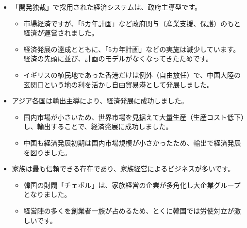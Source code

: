 \documentclass[
]{book}
\begin{document}
\begin{itemize}
\item
  「開発独裁」で採用された経済システムは、政府主導型です。

  \begin{itemize}
  \item
    市場経済ですが、「5カ年計画」など政府関与（産業支援、保護）のもと経済が運営されました。
  \item
    経済発展の達成とともに、「5カ年計画」などの実施は減少しています。経済の先頭に並び、計画のモデルがなくなってきたためです。
  \item
    イギリスの植民地であった香港だけは例外（自由放任）で、中国大陸の玄関口という地の利を活かし自由貿易港として発展しました。
  \end{itemize}
\item
  アジア各国は輸出主導により、経済発展に成功しました。

  \begin{itemize}
  \item
    国内市場が小さいため、世界市場を見据えて大量生産（生産コスト低下）し、輸出することで、経済発展に成功しました。
  \item
    中国も経済発展初期は国内市場規模が小さかったため、輸出で経済発展を図りました。
  \end{itemize}
\item
  家族は最も信頼できる存在であり、家族経営によるビジネスが多いです。

  \begin{itemize}
  \item
    韓国の財閥「チェボル」は、家族経営の企業が多角化し大企業グループとなりました。
  \item
    経営陣の多くを創業者一族が占めるため、とくに韓国では労使対立が激しいです。
  \end{itemize}
\end{itemize}
\end{document}
